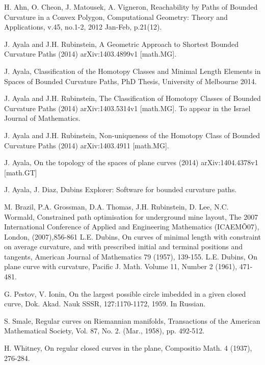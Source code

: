 \documentclass{amsart}
\theoremstyle{definition}
\theoremstyle{remark}
\numberwithin{equation}{section}
\begin{document}

   \begin{thebibliography}{11} \rm

    H. Ahn, O. Cheon, J. Matousek, A. Vigneron, Reachability by Paths of Bounded Curvature in a Convex Polygon, {Computational Geometry: Theory and Applications, v.45, no.1-2, 2012 Jan-Feb, p.21(12).}
 
     J. Ayala and J.H. Rubinstein, A Geometric Approach to Shortest Bounded Curvature Paths (2014) arXiv:1403.4899v1 [math.MG].

   J. Ayala, Classification of the Homotopy Classes and Minimal Length Elements in Spaces of Bounded Curvature Paths, PhD Thesis, University of Melbourne 2014.
   
        J. Ayala and J.H. Rubinstein, The Classification of Homotopy Classes of Bounded Curvature Paths (2014) arXiv:1403.5314v1 [math.MG]. {To appear in the Israel Journal of Mathematics.}
   
       J. Ayala and J.H. Rubinstein, Non-uniqueness of the Homotopy Class of Bounded Curvature Paths (2014) arXiv:1403.4911 [math.MG].
   
 
   
      J. Ayala, On the topology of the spaces of plane curves (2014) arXiv:1404.4378v1 [math.GT]
 

  
J. Ayala, J. Diaz, Dubins Explorer: Software for bounded curvature paths.  

  

   M. Brazil, P.A. Grossman, D.A. Thomas, J.H. Rubinstein, D. Lee, N.C. Wormald, Constrained path optimisation for underground mine layout, {The 2007 International Conference of Applied and Engineering Mathematics (ICAEMÕ07), London, (2007),856-861}
 L.E. Dubins,  On curves of minimal length with constraint on average curvature, and with prescribed initial and terminal positions and tangents, { American Journal of Mathematics 79 (1957), 139-155.}
  L.E. Dubins, On plane curve with curvature, {Pacific J. Math. Volume 11, Number 2 (1961), 471-481.}

  G. Pestov, V. Ionin, On the largest possible circle imbedded in a given closed curve, {Dok. Akad. Nauk SSSR, 127:1170-1172, 1959}. In Russian.

 S. Smale, Regular curves on Riemannian manifolds, Transactions of the American Mathematical Society, Vol. 87, No. 2. (Mar., 1958), pp. 492-512.

H. Whitney,  On regular closed curves in the plane, {Compositio Math. 4 (1937), 276-284.}
\end{thebibliography}
\end{document}
